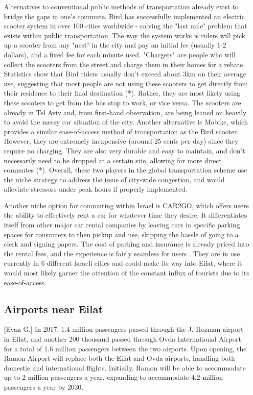 \documentclass[12pt]{article}                         %
\begin{document}
Alternatives to conventional public methods of transportation already exist to bridge the gaps in one's commute. Bird has successfully implemented an electric scooter system in over 100 cities worldwide - solving the "last mile" problem that exists within public transportation. The way the system works is riders will pick up a scooter from any "nest" in the city and pay an initial fee (usually 1-2 dollars), and a fixed fee for each minute used. "Chargers" are people who will collect the scooters from the street and charge them in their homes for a rebate \cite{BirdIsrael}. Statistics show that Bird riders usually don't exceed about 3km on their average use, suggesting that most people are not using these scooters to get directly from their residence to their final destination (*). Rather, they are most likely using these scooters to get from the bus stop to work, or vice versa. The scooters are already in Tel Aviv and, from first-hand observation, are being leaned on heavily to avoid the messy car situation of the city. Another alternative is Mobike, which provides a similar ease-of-access method of transportation as the Bird scooter. However, they are extremely inexpensive (around 25 cents per day) since they require no charging. They are also very durable and easy to maintain, and don't necessarily need to be dropped at a certain site, allowing for more direct commutes (*). Overall, these two players in the global transportation scheme use the niche strategy to address the issue of city-wide congestion, and would alleviate stressors under peak hours if properly implemented. 

Another niche option for commuting within Israel is CAR2GO, which offers users the ability to effectively rent a car for whatever time they desire. It differentiates itself from other major car rental companies by leaving cars in specific parking spaces for consumers to then pickup and use, skipping the hassle of going to a clerk and signing papers. The cost of parking and insurance is already priced into the rental fees, and the experience is fairly seamless for users \cite{OrenDoriandMeiravMoran2018IsraeliHaaretz.com}. They are in use currently in 6 different Israeli cities and could make its way into Eilat, where it would most likely garner the attention of the constant influx of tourists due to its ease-of-access. 

\subsection{Airports near Eilat}[Evan G.]
In 2017, 1.4 million passengers passed through the J. Hozman airport in Eilat, and another 200 thousand passed through Ovda International Airport for a total of 1.6 million passengers between the two airports. Upon opening, the Ramon Airport will replace both the Eilat and Ovda airports, handling both domestic and international flights. Initially, Ramon will be able to accommodate up to 2 million passengers a year, expanding to accommodate 4.2 million passengers a year by 2030.
\end{document}
